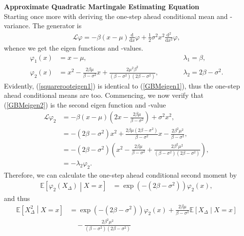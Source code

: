 \noindent \textbf{Approximate Quadratic Martingale Estimating Equation}\\
\noindent Starting once more with deriving the one-step ahead conditional mean and - variance. The generator is
\begin{align}
    \mathcal{L}\varphi = -\beta\left(x - \mu\right)\frac{\mathrm{d}}{\mathrm{d}x}\varphi + \frac{1}{2}\sigma^2 x^2 \frac{\mathrm{d}^2}{\mathrm{d}x^2}\varphi,
\end{align}
whence we get the eigen functions and -values.
\begin{align}
    \varphi_1(x) &= x - \mu, \qquad &&\lambda_1 = \beta, \label{GBMeigen1} \\
    \varphi_2(x) &= x^2 - \frac{2\beta\mu}{\beta - \sigma^2}x + \frac{2\mu^2\beta^2}{\left(\beta - \sigma^2\right)\left(2\beta - \sigma^2\right)}, \qquad &&\lambda_2 = 2\beta - \sigma^2 \label{GBMeigen2}.
\end{align}
Evidently, (\ref{squarerooteigen1}) is identical to (\ref{GBMeigen1}), thus the one-step ahead conditional means are too. Commencing, we now verify that (\ref{GBMeigen2}) is the second eigen function and -value
\begin{align}
    \mathcal{L}\varphi_2 & = -\beta\left(x-\mu\right)\left(2x - \frac{2\beta\mu}{\beta-\sigma^2}\right) + \sigma^2x^2,\\
    &=-\left(2\beta - \sigma^2\right)x^2 + \frac{2\beta\mu\left(2\beta-\sigma^2\right)}{\beta - \sigma^2}x - \frac{2\beta^2\mu^2}{\beta - \sigma^2}, \\
    &= -\left(2\beta -\sigma^2\right)\left(x^2 - \frac{2\beta\mu}{\beta-\sigma^2} + \frac{2\beta^2\mu^2}{\left(\beta-\sigma^2\right)\left(2\beta-\sigma^2\right)}\right),\\
    &= - \lambda_2 \varphi_2.
\end{align}
Therefore, we can calculate the one-step ahead conditional second moment by
\begin{align}
    \mathbb{E}\left[\varphi_2(X_\Delta)\middle|X = x\right] &= \exp\left(-\left(2\beta - \sigma^2\right)\right)\varphi_2(x),
\end{align}
and thus
\begin{align}
    \mathbb{E}\left[X_\Delta^2 \middle| X = x\right] &= \exp\left(-\left(2\beta - \sigma^2\right)\right)\varphi_2(x) + \frac{2\beta\mu}{\beta-\sigma^2} \mathbb{E}\left[X_\Delta\middle|X=x\right] \nonumber \\
    &\quad - \frac{2\beta^2\mu^2}{\left(\beta-\sigma^2\right)\left(2\beta-\sigma^2\right)} \label{CIR_secondmoment}
\end{align}
